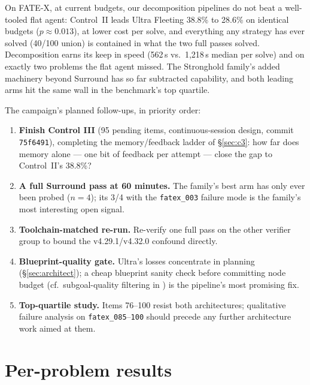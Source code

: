 \documentclass[12pt, a4paper]{article}
\newcommand{\run}[1]{\texttt{#1}}
\begin{document}
On FATE-X, at current budgets, our decomposition pipelines do not beat a
well-tooled flat agent: Control~II leads Ultra Fleeting 38.8\% to 28.6\% on
identical budgets ($p\approx0.013$), at lower cost per solve, and everything
any strategy has ever solved (40/100 union) is contained in what the two
full passes solved. Decomposition earns its keep in speed (562\,s vs.\
1{,}218\,s median per solve) and on exactly two problems the flat agent
missed. The Stronghold family's added machinery beyond Surround has so far
subtracted capability, and both leading arms hit the same wall in the
benchmark's top quartile.

The campaign's planned follow-ups, in priority order:

\begin{enumerate}[itemsep=2pt]
\item \textbf{Finish Control III} (95 pending items, continuous-session
      design, commit \run{75f6491}), completing the memory/feedback ladder of
      \S\ref{sec:c3}: how far does memory alone --- one bit of feedback per
      attempt --- close the gap to Control~II's 38.8\%?
\item \textbf{A full Surround pass at 60 minutes.} The family's best arm has
      only ever been probed ($n{=}4$); its 3/4 with the \run{fatex\_003}
      failure mode is the family's most interesting open signal.
\item \textbf{Toolchain-matched re-run.} Re-verify one full pass on the other
      verifier group to bound the v4.29.1/v4.32.0 confound directly.
\item \textbf{Blueprint-quality gate.} Ultra's losses concentrate in planning
      (\S\ref{sec:architect}); a cheap blueprint sanity check before
      committing node budget (cf.\ subgoal-quality filtering in
      \cite{deepseekproverv2}) is the pipeline's most promising fix.
\item \textbf{Top-quartile study.} Items 76--100 resist both architectures;
      qualitative failure analysis on \run{fatex\_085}--\run{100} should
      precede any further architecture work aimed at them.
\end{enumerate}

\newpage
\printbibliography

\newpage
\appendix
\section{Per-problem results}
\label{app:items}
\end{document}
